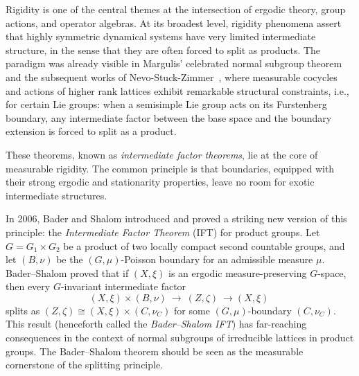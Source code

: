 \documentclass[12pt]{amsart}
\theoremstyle{definition}
\begin{document}
Rigidity is one of the central themes at the intersection of ergodic theory, group actions, and operator algebras. 
At its broadest level, rigidity phenomena assert that highly symmetric dynamical systems have very limited intermediate structure, in the sense that they are often forced to split as products. 
The paradigm was already visible in Margulis’ celebrated normal subgroup theorem and the subsequent works of Nevo-Stuck-Zimmer~\cite{stuck1994stabilizers,nevo1999homogenous,nevo2002generalization}, where measurable cocycles and actions of higher rank lattices exhibit remarkable structural constraints, i.e., for certain Lie groups: when a semisimple Lie group acts on its Furstenberg boundary, any intermediate factor between the base space and the boundary extension is forced to split as a product.


These theorems, known as \textit{intermediate factor theorems}, lie at the core of measurable rigidity. The common principle is that boundaries, equipped with their strong ergodic and stationarity properties, leave no room for exotic intermediate structures.  

\medskip

In 2006, Bader and Shalom \cite{BS06} introduced and proved a striking new version of this principle: the \textit{Intermediate Factor Theorem} (IFT) for product groups. 
Let $G=G_1\times G_2$ be a product of two locally compact second countable groups, and let $(B,\nu)$ be the $(G,\mu)$-Poisson boundary for an admissible measure $\mu$. 
Bader--Shalom proved that if $(X,\xi)$ is an ergodic measure-preserving $G$-space, then every $G$-invariant intermediate factor
\[(X,\xi)\times (B,\nu)
 \ \to \ (Z,\zeta) \ \to (X,\xi)\ 
\]
splits as $(Z,\zeta)\cong (X,\xi)\times(C,\nu_C)$ for some $(G,\mu)$-boundary $(C,\nu_C)$. 
This result (henceforth called the \textit{Bader--Shalom IFT}) has far-reaching consequences in the context of normal subgroups of irreducible lattices in product groups. 
The Bader--Shalom theorem should be seen as the measurable cornerstone of the splitting principle. 
\end{document}
